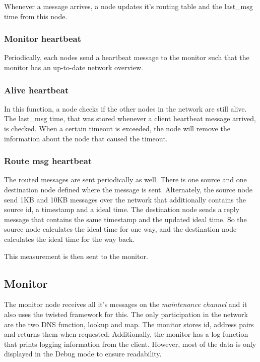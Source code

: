 \documentclass[paper=a4, fontsize=11pt]{scrartcl} %
\numberwithin{equation}{section} %
\numberwithin{figure}{section} %
\numberwithin{table}{section} %
\begin{document}
Whenever a message arrives, a node updates it's routing table and the last\_msg time from this node.

\subsubsection{Monitor heartbeat}
Periodically, each nodes send a heartbeat message to the monitor such that the monitor has an up-to-date network overview.

\subsubsection{Alive heartbeat}
In this function, a node checks if the other nodes in the network are still alive. The last\_msg time, that was stored whenever a client heartbeat message arrived, is checked. When a certain timeout is exceeded, the node will remove the information about the node that caused the timeout. 

\subsubsection{Route msg heartbeat}
The routed messages are sent periodically as well. There is one source and one destination node defined where the message is sent. Alternately, the source node send 1KB and 10KB messages over the network that additionally contains the source id, a timestamp and a ideal time. The destination node sends a reply message that contains the same timestamp and the updated ideal time. So the source node calculates the ideal time for one way, and the destination node calculates the ideal time for the way back.

This measurement is then sent to the monitor.

\subsection{Monitor}

The monitor node receives all it's messages on the \textit{maintenance channel} and it also uses the twisted framework for this. The only participation in the network are the two DNS function, lookup and map. The monitor stores id, address pairs and returns them when requested. Additionally, the monitor has a log function that prints logging information from the client. However, most of the data is only displayed in the Debug mode to ensure readability. 
\end{document}
